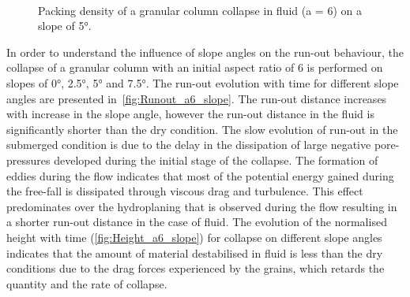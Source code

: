\documentclass[epj,twocolumn]{webofc}
\begin{document}
\begin{figure}
\\
\caption{Packing density of a granular column collapse in fluid (a = 6) on a 
slope of 5\si{\degree}.}
\label{fig:a6_slope_voro}
\end{figure}


In order to understand the influence of slope angles on the run-out behaviour, 
the collapse of a granular column with an initial aspect ratio of 6 is 
performed on slopes of 0\si{\degree}, 2.5\si{\degree}, 5\si{\degree} and 
7.5\si{\degree}. The run-out evolution with time for different slope angles are 
presented in~\cref{fig:Runout_a6_slope}. The run-out distance increases with 
increase in the slope angle, however the run-out distance in the fluid is 
significantly shorter than the dry condition. The slow evolution of run-out in 
the submerged condition is due to the delay in the dissipation of large 
negative pore-pressures developed during the initial stage of the collapse. The 
formation of eddies during the flow indicates that most of the potential energy 
gained during the free-fall is dissipated through viscous drag and turbulence. 
This effect predominates over the hydroplaning that is observed during 
the flow resulting in a shorter run-out distance in the case of fluid. The 
evolution of the normalised height with time (\cref{fig:Height_a6_slope}) for 
collapse on different slope angles indicates that the 
amount of material destabilised in fluid is less than the dry conditions due to 
the drag forces experienced by the grains, which retards the quantity and the 
rate of collapse.
\end{document}
